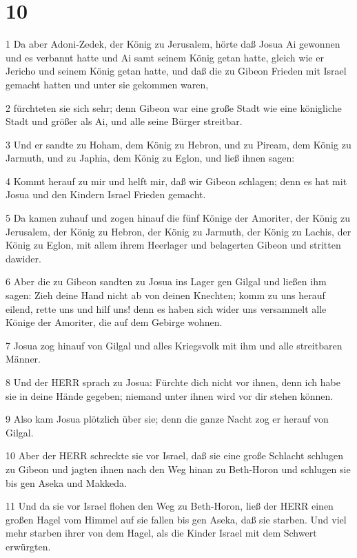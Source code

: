 \chapter{10}

\par 1 Da aber Adoni-Zedek, der König zu Jerusalem, hörte daß Josua Ai gewonnen und es verbannt hatte und Ai samt seinem König getan hatte, gleich wie er Jericho und seinem König getan hatte, und daß die zu Gibeon Frieden mit Israel gemacht hatten und unter sie gekommen waren,
\par 2 fürchteten sie sich sehr; denn Gibeon war eine große Stadt wie eine königliche Stadt und größer als Ai, und alle seine Bürger streitbar.
\par 3 Und er sandte zu Hoham, dem König zu Hebron, und zu Piream, dem König zu Jarmuth, und zu Japhia, dem König zu Eglon, und ließ ihnen sagen:
\par 4 Kommt herauf zu mir und helft mir, daß wir Gibeon schlagen; denn es hat mit Josua und den Kindern Israel Frieden gemacht.
\par 5 Da kamen zuhauf und zogen hinauf die fünf Könige der Amoriter, der König zu Jerusalem, der König zu Hebron, der König zu Jarmuth, der König zu Lachis, der König zu Eglon, mit allem ihrem Heerlager und belagerten Gibeon und stritten dawider.
\par 6 Aber die zu Gibeon sandten zu Josua ins Lager gen Gilgal und ließen ihm sagen: Zieh deine Hand nicht ab von deinen Knechten; komm zu uns herauf eilend, rette uns und hilf uns! denn es haben sich wider uns versammelt alle Könige der Amoriter, die auf dem Gebirge wohnen.
\par 7 Josua zog hinauf von Gilgal und alles Kriegsvolk mit ihm und alle streitbaren Männer.
\par 8 Und der HERR sprach zu Josua: Fürchte dich nicht vor ihnen, denn ich habe sie in deine Hände gegeben; niemand unter ihnen wird vor dir stehen können.
\par 9 Also kam Josua plötzlich über sie; denn die ganze Nacht zog er herauf von Gilgal.
\par 10 Aber der HERR schreckte sie vor Israel, daß sie eine große Schlacht schlugen zu Gibeon und jagten ihnen nach den Weg hinan zu Beth-Horon und schlugen sie bis gen Aseka und Makkeda.
\par 11 Und da sie vor Israel flohen den Weg zu Beth-Horon, ließ der HERR einen großen Hagel vom Himmel auf sie fallen bis gen Aseka, daß sie starben. Und viel mehr starben ihrer von dem Hagel, als die Kinder Israel mit dem Schwert erwürgten.
